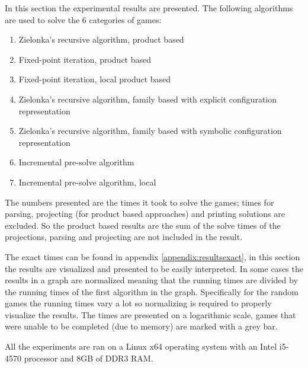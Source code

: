 In this section the experimental results are presented. The following algorithms are used to solve the 6 categories of games:
\begin{enumerate}
	\item Zielonka's recursive algorithm, product based
	\item Fixed-point iteration, product based
	\item Fixed-point iteration, local product based
	\item Zielonka's recursive algorithm, family based with explicit configuration representation
	\item Zielonka's recursive algorithm, family based with symbolic configuration representation
	\item Incremental pre-solve algorithm
	\item Incremental pre-solve algorithm, local
\end{enumerate}

The numbers presented are the times it took to solve the games; times for parsing, projecting (for product based approaches) and printing solutions are excluded. So the product based results are the sum of the solve times of the projections, parsing and projecting are not included in the result.

The exact times can be found in appendix \ref{appendix:resultsexact}, in this section the results are visualized and presented to be easily interpreted. In some cases the results in a graph are normalized meaning that the running times are divided by the running times of the first algorithm in the graph. Specifically for the random games the running times vary a lot so normalizing is required to properly visualize the results. The times are presented on a logarithmic scale, games that were unable to be completed (due to memory) are marked with a grey bar.

All the experiments are ran on a Linux x64 operating system with an Intel i5-4570 processor and 8GB of DDR3 RAM.

